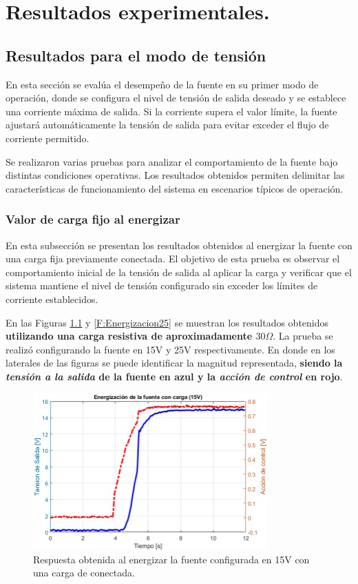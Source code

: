 \chapter{Resultados experimentales.}

\label{C:Resultados_experimentales.}

\section{Resultados para el modo de tensión}
En esta sección se evalúa el desempeño de la fuente en su primer modo de operación, donde se configura el nivel de tensión de salida deseado y se establece una corriente máxima de salida. Si la corriente supera el valor límite, la fuente ajustará automáticamente la tensión de salida para evitar exceder el flujo de corriente permitido. \par  
Se realizaron varias pruebas para analizar el comportamiento de la fuente bajo distintas condiciones operativas. Los resultados obtenidos permiten delimitar las características de funcionamiento del sistema en escenarios típicos de operación. \par 
\subsection{Valor de carga fijo al energizar}
En esta subsección se presentan los resultados obtenidos al energizar la fuente con una carga fija previamente conectada. El objetivo de esta prueba es observar el comportamiento inicial de la tensión de salida al aplicar la carga y verificar que el sistema mantiene el nivel de tensión configurado sin exceder los límites de corriente establecidos.\par
En las Figuras \ref{F:Energizacion15} y \ref{F:Energizacion25} se muestran los resultados obtenidos \textbf{utilizando una carga resistiva de aproximadamente $30\Omega$}. La prueba se realizó configurando la fuente en 15V y 25V respectivamente. En donde en los laterales de las figuras se puede identificar la magnitud representada, \textbf{siendo la \textit{tensión a la salida} de la fuente en \textbf{azul} y la \textit{acción de control} en \textbf{rojo}}. 
\begin{figure}[htbp]
    \centering
    \includegraphics[width=0.8\textwidth]{./imagenes/Energizacion15.jpg}
    \caption{Respuesta obtenida al energizar la fuente configurada en 15V con una carga de conectada.}
    \label{F:Energizacion15}
\end{figure}

